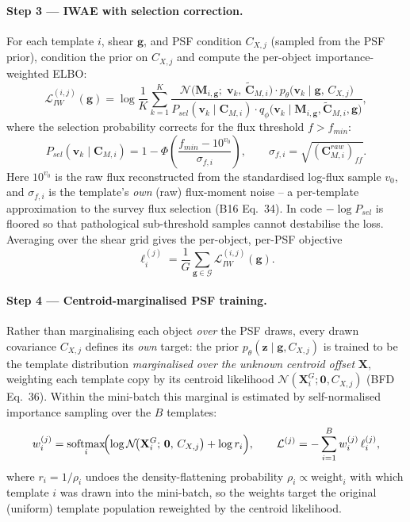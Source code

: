 \paragraph{Step 3 — IWAE with selection correction.}
For each template $i$, shear $\mathbf{g}$, and PSF condition $C_{X,j}$
(sampled from the PSF prior), condition the prior on $C_{X,j}$ and compute the
per-object importance-weighted ELBO:
\begin{equation}
  \mathcal{L}_{IW}^{(i,j)}(\mathbf{g})
  = \log\frac{1}{K}\sum_{k=1}^{K}
    \frac{
      \mathcal{N}\!\bigl(\mathbf{M}_{i,\mathbf{g}};\;\mathbf{v}_k,\,\tilde{\mathbf{C}}_{M,i}\bigr)
      \cdot p_\theta\!\bigl(\mathbf{v}_k\mid\mathbf{g},\,C_{X,j}\bigr)
    }{
      P_{sel}(\mathbf{v}_k\mid\mathbf{C}_{M,i})
      \cdot q_\phi\!\bigl(\mathbf{v}_k\mid\mathbf{M}_{i,\mathbf{g}},\tilde{\mathbf{C}}_{M,i},\mathbf{g}\bigr)
    },
  \label{eq:IWAE}
\end{equation}
where the selection probability corrects for the flux threshold $f>f_{min}$:
\begin{equation}
  P_{sel}(\mathbf{v}_k\mid\mathbf{C}_{M,i})
  = 1-\Phi\!\left(\frac{f_{min}-10^{v_0}}{\sigma_{f,i}}\right),
  \qquad \sigma_{f,i}=\sqrt{(\mathbf{C}_{M,i}^{raw})_{ff}}.
\end{equation}
Here $10^{v_0}$ is the raw flux reconstructed from the standardised log-flux
sample $v_0$, and $\sigma_{f,i}$ is the template's \emph{own} (raw) flux-moment
noise -- a per-template approximation to the survey flux selection
(B16 Eq.~34).  In code $-\log P_{sel}$ is floored so that pathological
sub-threshold samples cannot destabilise the loss.  Averaging over the shear
grid gives the per-object, per-PSF objective
\begin{equation}
  \ell_i^{(j)}
  = \frac{1}{G}\sum_{\mathbf{g}\in\mathcal{G}}\mathcal{L}_{IW}^{(i,j)}(\mathbf{g}).
  \label{eq:per_obj}
\end{equation}

\paragraph{Step 4 — Centroid-marginalised PSF training.}
Rather than marginalising each object \emph{over} the PSF draws, every drawn
covariance $C_{X,j}$ defines its \emph{own} target: the prior
$p_\theta(\mathbf{z}\mid\mathbf{g},C_{X,j})$ is trained to be the template
distribution \emph{marginalised over the unknown centroid offset}
$\mathbf{X}$, weighting each template copy by its centroid likelihood
$\mathcal{N}(\mathbf{X}_i^G;\mathbf{0},C_{X,j})$ (BFD Eq.\ 36).  Within the
mini-batch this marginal is estimated by self-normalised importance sampling
over the $B$ templates:
\begin{equation}
  w_i^{(j)} = \operatorname*{softmax}_{i}\!\Bigl(
      \log\mathcal{N}\!\bigl(\mathbf{X}_i^G;\,\mathbf{0},\,C_{X,j}\bigr)
      + \log r_i \Bigr),
  \qquad
  \mathcal{L}^{(j)} = -\sum_{i=1}^{B} w_i^{(j)}\,\ell_i^{(j)},
  \label{eq:PSF_marg}
\end{equation}
where $r_i = 1/\rho_i$ undoes the density-flattening probability
$\rho_i\propto\text{weight}_i$ with which template $i$ was drawn into the
mini-batch, so the weights target the original (uniform) template population
reweighted by the centroid likelihood.

